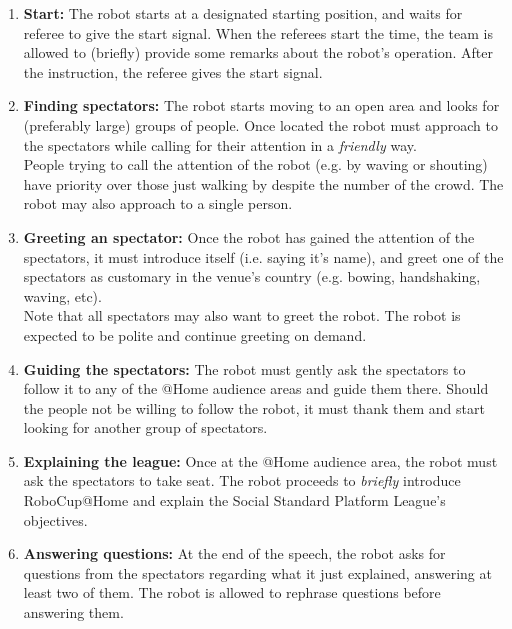 \begin{enumerate}
	\item \textbf{Start:} The robot starts at a designated starting position, and waits for referee to give the start signal. When the referees start the time, the team is allowed to (briefly) provide some remarks about the robot's operation. After the instruction, the referee gives the start signal.\\

	\item \textbf{Finding spectators:} The robot starts moving to an open area and looks for (preferably large) groups of people. Once located the robot must approach to the spectators while calling for their attention in a \emph{friendly} way.\\

	People trying to call the attention of the robot (e.g. by waving or shouting) have priority over those just walking by despite the number of the crowd. The robot may also approach to a single person.\\

	\item \textbf{Greeting an spectator:} Once the robot has gained the attention of the spectators, it must introduce itself (i.e. saying it's name), and greet one of the spectators as customary in the venue's country (e.g. bowing, handshaking, waving, etc).\\

	Note that all spectators may also want to greet the robot. The robot is expected to be polite and continue greeting on demand.\\

	\item \textbf{Guiding the spectators:} The robot must gently ask the spectators to follow it to any of the @Home audience areas and guide them there. Should the people not be willing to follow the robot, it must thank them and start looking for another group of spectators.\\

	\item \textbf{Explaining the league:} Once at the @Home audience area, the robot must ask the spectators to take seat. The robot proceeds to \textit{briefly} introduce RoboCup@Home and explain the Social Standard Platform League's objectives. \\

	\item \textbf{Answering questions:} At the end of the speech, the robot asks for questions from the spectators regarding what it just explained, answering at least two of them. The robot is allowed to rephrase questions before answering them.\\

\end{enumerate}

